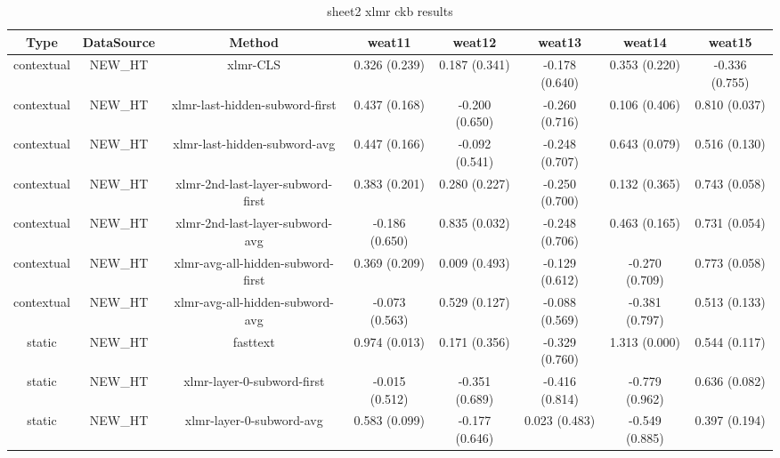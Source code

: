 \begin{sidewaystable}[htb]
    \centering
    \caption{sheet2 xlmr ckb results}
    \label{appendix_tab:sheet2_xlmr_ckb_results}
    \small
    \begin{tabular}{@{}cccccccc@{}}
        \toprule
        Type & DataSource & Method & weat11 & weat12 & weat13 & weat14 & weat15 \\
        \midrule
        contextual & NEW\_HT & xlmr-CLS & 0.326 (0.239) & 0.187 (0.341) & -0.178 (0.640) & 0.353 (0.220) & -0.336 (0.755) \\
        contextual & NEW\_HT & xlmr-last-hidden-subword-first & 0.437 (0.168) & -0.200 (0.650) & -0.260 (0.716) & 0.106 (0.406) & 0.810 (0.037) \\
        contextual & NEW\_HT & xlmr-last-hidden-subword-avg & 0.447 (0.166) & -0.092 (0.541) & -0.248 (0.707) & 0.643 (0.079) & 0.516 (0.130) \\
        contextual & NEW\_HT & xlmr-2nd-last-layer-subword-first & 0.383 (0.201) & 0.280 (0.227) & -0.250 (0.700) & 0.132 (0.365) & 0.743 (0.058) \\
        contextual & NEW\_HT & xlmr-2nd-last-layer-subword-avg & -0.186 (0.650) & 0.835 (0.032) & -0.248 (0.706) & 0.463 (0.165) & 0.731 (0.054) \\
        contextual & NEW\_HT & xlmr-avg-all-hidden-subword-first & 0.369 (0.209) & 0.009 (0.493) & -0.129 (0.612) & -0.270 (0.709) & 0.773 (0.058) \\
        contextual & NEW\_HT & xlmr-avg-all-hidden-subword-avg & -0.073 (0.563) & 0.529 (0.127) & -0.088 (0.569) & -0.381 (0.797) & 0.513 (0.133) \\
        static & NEW\_HT & fasttext & 0.974 (0.013) & 0.171 (0.356) & -0.329 (0.760) & 1.313 (0.000) & 0.544 (0.117) \\
        static & NEW\_HT & xlmr-layer-0-subword-first & -0.015 (0.512) & -0.351 (0.689) & -0.416 (0.814) & -0.779 (0.962) & 0.636 (0.082) \\
        static & NEW\_HT & xlmr-layer-0-subword-avg & 0.583 (0.099) & -0.177 (0.646) & 0.023 (0.483) & -0.549 (0.885) & 0.397 (0.194) \\
        \bottomrule
    \end{tabular}
\end{sidewaystable}